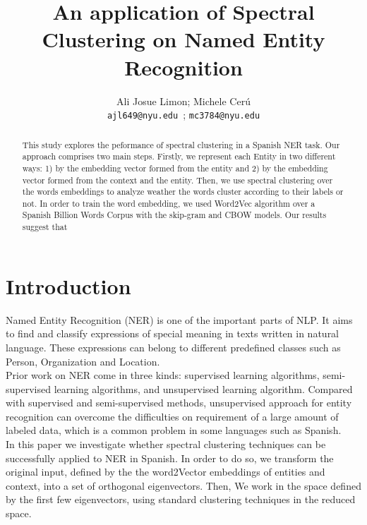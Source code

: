 \documentclass[]{article}
\title{An application of Spectral Clustering on Named Entity Recognition}
\author{Ali Josue Limon; Michele Cer\'u \\ 
\texttt{ajl649@nyu.edu }; \texttt{mc3784@nyu.edu}
}
\begin{document}
\maketitle
\newcommand{\slugmaster}{%
\slugger{siads}{xxxx}{xx}{x}{x---x}}%



\begin{abstract}
This study explores the peformance of spectral clustering in a Spanish NER task. Our approach comprises two main steps. Firstly, we represent each Entity in two different ways: 1) by the embedding vector formed from the entity and 2) by the embedding vector formed from the context and the entity.  Then, we use spectral clustering over the words embeddings  to analyze weather the words cluster according to their labels or not.  In order to train the word embedding, we used Word2Vec algorithm over a Spanish Billion Words Corpus with the skip-gram and CBOW models.  Our results suggest that 


\end{abstract}

\section{Introduction}


Named Entity Recognition (NER) is one of the important parts of NLP. It aims to find and classify expressions of special meaning in texts written in natural language.  These expressions can belong to different predefined classes such as Person, Organization and Location. \\

Prior work on NER come in three kinds: supervised learning algorithms, semi-supervised learning algorithms, and unsupervised learning algorithm. Compared with supervised and semi-supervised methods, unsupervised approach for entity recognition can overcome the difficulties on requirement of a large amount of labeled data, which is a common problem in some languages such as Spanish. \\

In this paper we investigate whether spectral clustering techniques can be successfully applied to NER in Spanish. In order to do so, we transform the original input, defined by the the word2Vector embeddings of entities and context, into a set of orthogonal eigenvectors. Then, We work in the space defined by the first few eigenvectors, using standard clustering techniques in the reduced space. \\
\end{document}

